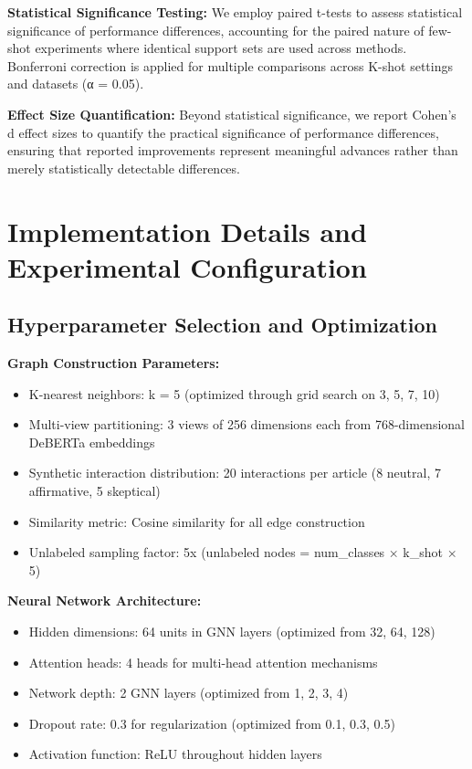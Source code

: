 \textbf{Statistical Significance Testing:} We employ paired t-tests to assess statistical significance of performance differences, accounting for the paired nature of few-shot experiments where identical support sets are used across methods. Bonferroni correction is applied for multiple comparisons across K-shot settings and datasets (α = 0.05).

\textbf{Effect Size Quantification:} Beyond statistical significance, we report Cohen's d effect sizes to quantify the practical significance of performance differences, ensuring that reported improvements represent meaningful advances rather than merely statistically detectable differences.

\section{Implementation Details and Experimental Configuration}

\subsection{Hyperparameter Selection and Optimization}

\textbf{Graph Construction Parameters:}
\begin{itemize}
\item K-nearest neighbors: k = 5 (optimized through grid search on {3, 5, 7, 10})
\item Multi-view partitioning: 3 views of 256 dimensions each from 768-dimensional DeBERTa embeddings
\item Synthetic interaction distribution: 20 interactions per article (8 neutral, 7 affirmative, 5 skeptical)
\item Similarity metric: Cosine similarity for all edge construction
\item Unlabeled sampling factor: 5x (unlabeled nodes = num_classes × k_shot × 5)
\end{itemize}

\textbf{Neural Network Architecture:}
\begin{itemize}
\item Hidden dimensions: 64 units in GNN layers (optimized from {32, 64, 128})
\item Attention heads: 4 heads for multi-head attention mechanisms
\item Network depth: 2 GNN layers (optimized from {1, 2, 3, 4})
\item Dropout rate: 0.3 for regularization (optimized from {0.1, 0.3, 0.5})
\item Activation function: ReLU throughout hidden layers
\end{itemize}

